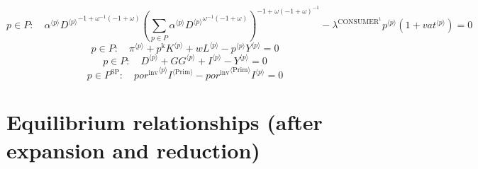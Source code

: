 \begin{equation}
p\in P\colon\quad {{\alpha}^{\langle p\rangle}} {{{D}^{\langle p\rangle}}^{-1 + {\omega}^{-1} \left(-1 + \omega\right)}} {\left(\sum_{p\in P} {{\alpha}^{\langle p\rangle}} {{{D}^{\langle p\rangle}}^{{\omega}^{-1} \left(-1 + \omega\right)}}\right)^{-1 + {\omega} \left(-1 + \omega\right)^{-1}}} - {\lambda^{\mathrm{CONSUMER}^{\mathrm{1}}}} {{p}^{\langle p\rangle}} \left(1 + {{v\!a\!t}}^{\langle p\rangle}\right) = 0
\end{equation}
\begin{equation}
p\in P\colon\quad {\pi}^{\langle p\rangle} + {p^{\mathrm{k}}} {{K}^{\langle p\rangle}} + {w} {{L}^{\langle p\rangle}} - {{p}^{\langle p\rangle}} {{Y}^{\langle p\rangle}} = 0
\end{equation}
\begin{equation}
p\in P\colon\quad {D}^{\langle p\rangle} + {{G\!G}}^{\langle p\rangle} + {I}^{\langle p\rangle} - {Y}^{\langle p\rangle} = 0
\end{equation}
\begin{equation}
p\in P^{\mathrm{SP}}\colon\quad {{{p\!o\!r}^{\mathrm{inv}}}^{\langle p\rangle}} {{I}^{\langle \mathrm{Prim}\rangle}} - {{{p\!o\!r}^{\mathrm{inv}}}^{\langle \mathrm{\mathrm{Prim}}\rangle}} {{I}^{\langle p\rangle}} = 0
\end{equation}



\section{Equilibrium relationships (after expansion and reduction)}

